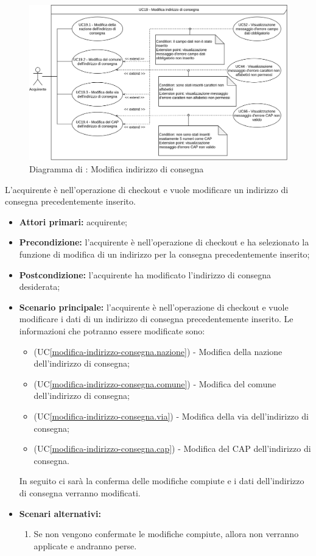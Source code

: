 \begin{figure}[H]
    \centering
    \includegraphics[scale=0.6]{Immagini/DiagrammiUC/Acquirente/ModificaIndirizzoConsegna.png}
    \caption{Diagramma di \actualUC: Modifica indirizzo di consegna} 
    \label{fig:modifica-indirizzo-consegna}
\end{figure}

L'acquirente è nell'operazione di checkout e vuole modificare un indirizzo di consegna precedentemente inserito.
\begin{itemize}
    \item \textbf{Attori primari:} acquirente;
    \item \textbf{Precondizione:} l'acquirente è nell'operazione di checkout e ha selezionato la funzione di modifica di un indirizzo per la consegna precedentemente inserito;
    \item \textbf{Postcondizione:} l'acquirente ha modificato l'indirizzo di consegna desiderata;
    \item \textbf{Scenario principale:} l'acquirente è nell'operazione di checkout e vuole modificare i dati di un indirizzo di consegna precedentemente inserito. Le informazioni che potranno essere modificate sono:
    \begin{itemize}
        \item (UC\ref{modifica-indirizzo-consegna.nazione}) - Modifica della nazione dell'indirizzo di consegna;
		\item (UC\ref{modifica-indirizzo-consegna.comune}) - Modifica del comune dell'indirizzo di consegna;
		\item (UC\ref{modifica-indirizzo-consegna.via}) - Modifica della via dell'indirizzo di consegna;
		\item (UC\ref{modifica-indirizzo-consegna.cap}) - Modifica del CAP dell'indirizzo di consegna.
    \end{itemize}
    In seguito ci sarà la conferma delle modifiche compiute e i dati dell'indirizzo di consegna verranno modificati.
    \item \textbf{Scenari alternativi:}
    \begin{enumerate}[label=\lett]
        \item Se non vengono confermate le modifiche compiute, allora non verranno applicate e andranno perse.
    \end{enumerate}
\end{itemize}


